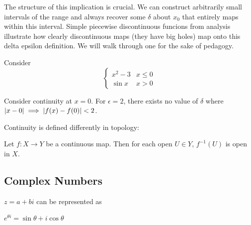 \documentclass[10pt]{article}
\begin{document}

The structure of this implication is crucial. We can construct arbitrarily
small intervals of the range and always recover some $\delta$ about $x_0$ that
entirely maps within this interval. Simple piecewise discontinuous funcions
from analysis illustrate how clearly discontinuous maps (they have big holes)
map onto this delta epsilon definition. We will walk through one for the sake of
pedagogy.

\begin{example}
Consider
\[ \begin{cases} 
      x^2 - 3 & x\leq 0 \\
			\sin x & x > 0
   \end{cases}
\]

Consider continuity at $x = 0$. For $\epsilon = 2$, there exists no value of
$\delta$ where $\lvert x - 0\rvert \implies \lvert f(x) - f(0)\rvert < 2$.
\end{example}


Continuity is defined differently in topology:

\begin{definition}
	Let $f: X \to Y$ be a continuous map. Then for each open $U\in Y$,
	$f^{-1}(U)$ is open in $X$.
\end{definition}

\subsection{Complex Numbers}


$z = a + bi$ can be represented as

$e^{\theta i} = \sin\theta + i \cos\theta$
\end{document}
